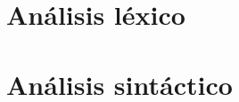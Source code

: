 \documentclass[11pt]{article}
\newcounter{subsubsubsection}[subsubsection]
\begin{document}
\section{Análisis léxico}
 {
  \let\section\subsection
  \let\subsection\subsubsection
  \let\subsubsection\subsubsubsection
  
 }

\section{Análisis sintáctico}
 {
  \let\section\subsection
  \let\subsection\subsubsection
  \let\subsubsection\subsubsubsection
  
 }
\end{document}
